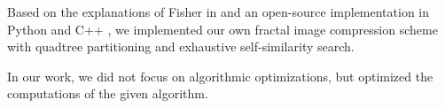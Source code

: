  Based on the explanations of Fisher in \cite{fisher2012}
and an open-source implementation in Python \cite{github-python} and C++
\cite{github-cpp}, we implemented our own fractal image compression scheme with
quadtree partitioning and exhaustive self-similarity search.

In our work, we did not focus on algorithmic optimizations, but optimized the
computations of the given algorithm.
